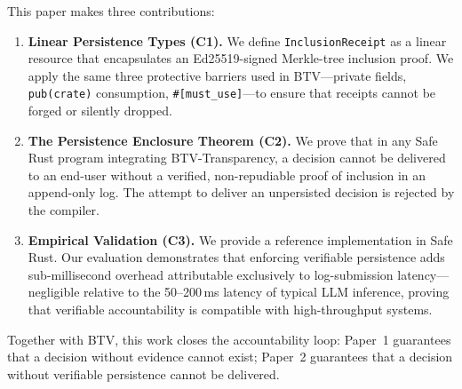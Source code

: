 This paper makes three contributions:
\begin{enumerate}
  \item \textbf{Linear Persistence Types (C1).} We define \texttt{InclusionReceipt}
  as a linear resource that encapsulates an Ed25519-signed Merkle-tree inclusion
  proof. We apply the same three protective barriers used in
  BTV---private fields, \texttt{pub(crate)} consumption, \texttt{\#[must\_use]}---to
  ensure that receipts cannot be forged or silently dropped.

  \item \textbf{The Persistence Enclosure Theorem (C2).} We prove that in any Safe
  Rust program integrating BTV-Transparency, a decision cannot be delivered to an
  end-user without a verified, non-repudiable proof of inclusion in an append-only
  log. The attempt to deliver an unpersisted decision is rejected by the compiler.

  \item \textbf{Empirical Validation (C3).} We provide a reference implementation in
  Safe Rust. Our evaluation demonstrates that enforcing verifiable persistence adds
  sub-millisecond overhead attributable exclusively to log-submission
  latency---negligible relative to the 50--200\,ms latency of typical LLM inference,
  proving that verifiable accountability is compatible with high-throughput systems.
\end{enumerate}

Together with BTV, this work closes the accountability loop: Paper~1 guarantees
that a decision without evidence cannot exist; Paper~2 guarantees that a decision
without verifiable persistence cannot be delivered.

